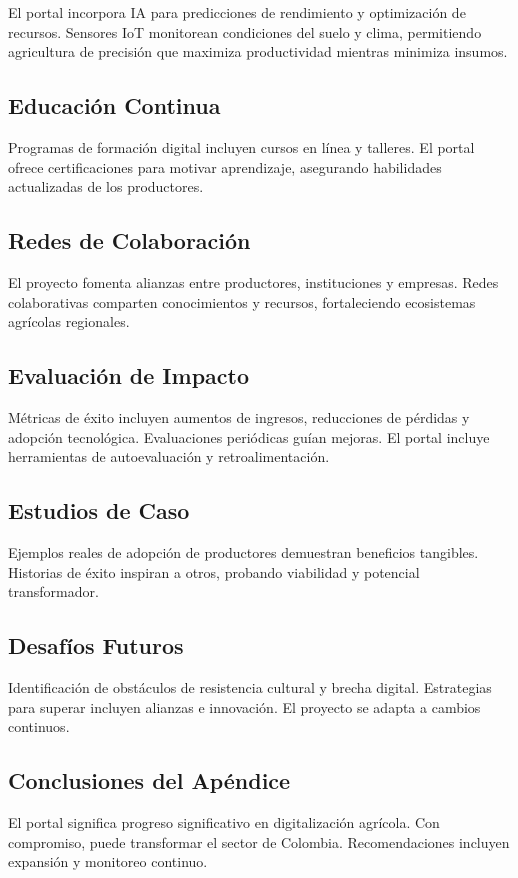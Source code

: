 El portal incorpora IA para predicciones de rendimiento y optimización de recursos. Sensores IoT monitorean condiciones del suelo y clima, permitiendo agricultura de precisión que maximiza productividad mientras minimiza insumos.
\subsection{Educación Continua}

Programas de formación digital incluyen cursos en línea y talleres. El portal ofrece certificaciones para motivar aprendizaje, asegurando habilidades actualizadas de los productores.
\subsection{Redes de Colaboración}

El proyecto fomenta alianzas entre productores, instituciones y empresas. Redes colaborativas comparten conocimientos y recursos, fortaleciendo ecosistemas agrícolas regionales.
\subsection{Evaluación de Impacto}

Métricas de éxito incluyen aumentos de ingresos, reducciones de pérdidas y adopción tecnológica. Evaluaciones periódicas guían mejoras. El portal incluye herramientas de autoevaluación y retroalimentación.
\subsection{Estudios de Caso}

Ejemplos reales de adopción de productores demuestran beneficios tangibles. Historias de éxito inspiran a otros, probando viabilidad y potencial transformador.
\subsection{Desafíos Futuros}

Identificación de obstáculos de resistencia cultural y brecha digital. Estrategias para superar incluyen alianzas e innovación. El proyecto se adapta a cambios continuos.
\subsection{Conclusiones del Apéndice}

El portal significa progreso significativo en digitalización agrícola. Con compromiso, puede transformar el sector de Colombia. Recomendaciones incluyen expansión y monitoreo continuo.
